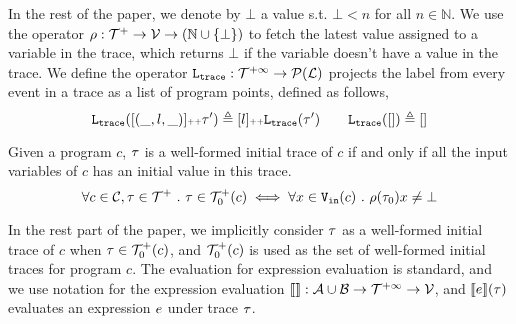 In the rest of the paper, we denote by $\bot$ a value s.t. $\bot < n $ for all $n \in \mathbb{N}$.
We use the operator $\rho : {\mathcal{T}^{+}}  \to \mathcal{V} \to(\mathbb{N} \cup \{\bot\})$ to fetch the latest value assigned to a variable in the trace, which returns $\bot$ if the variable doesn't have a value in the trace.
%
We define the operator $\mathtt{L}_{\mathtt{{trace}}} : \mathcal{T}^{+\infty} \to \mathcal{P}{(\mathcal{L})}$ projects the label from every event in a trace as a list of program points,
defined as follows,
\[
\mathtt{L}_{\mathtt{{trace}}}([(\_, l, \_)] {\scriptscriptstyle ++} \mathtt{\tau}') \triangleq [l] {\scriptscriptstyle ++} \mathtt{L}_{\mathtt{{trace}}}(\mathtt{\tau}')
\qquad
\mathtt{L}_{\mathtt{{trace}}}([ ]) \triangleq []
\]
%
%
\begin{defn}
  \label{def:initial_trace}
  Given a program $c$, $\mathtt{\tau}$ is a well-formed initial trace of $c$ if and only if all the input variables of $c$ has an initial value in this trace.
  \[
    \forall c \in \mathcal{C}, \mathtt{\tau} \in \mathcal{T}^{+} ~.~ \mathtt{\tau} \in \mathcal{T}^{+}_0(c) \iff 
    \forall x \in {\ensuremath{\mathtt{V_{\mathtt{in}}}}}(c) ~.~ \rho(\mathtt{\tau}_0) x \neq \bot
    \]
\end{defn}
%
In the rest part of the paper, we implicitly consider $\mathtt{\tau}$ as a well-formed initial trace of $c$ 
when $\mathtt{\tau} \in \mathcal{T}^{+}_0(c)$, and $\mathcal{T}^{+}_0(c)$ is used as the set of well-formed initial traces for program $c$.
%
The evaluation for expression evaluation is standard, and 
we use notation for the expression evaluation $\llbracket  \rrbracket : \mathcal{A} \cup \mathcal{B} \to \mathcal{T}^{+\infty} \to \mathcal{V}$, and $\llbracket e \rrbracket(\mathtt{\tau})$ evaluates an expression $e$ under trace $\mathtt{\tau}$.

